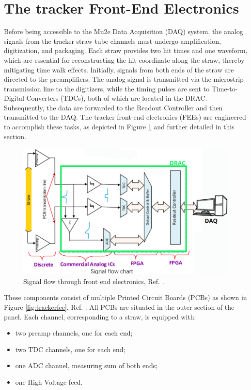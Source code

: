\section{The tracker Front-End Electronics}
Before being accessible to the Mu2e Data Acquisition (DAQ) system, the analog signals 
from the tracker straw tube channels must undergo amplification, digitization, and packaging. 
Each straw provides two hit times and one waveform, which are essential for 
reconstructing the hit coordinate along the straw, thereby mitigating time walk effects.
Initially, signals from both ends of the straw are directed to the preamplifiers. 
The analog signal is transmitted via the microstrip transmission line to the digitizers, 
while the timing pulses are sent to Time-to-Digital Converters (TDCs), both of which 
are located in the DRAC. Subsequently, the data are forwarded to the Readout Controller and then transmitted to the DAQ.
The tracker front-end electronics (FEEs) are engineered to accomplish these tasks, as depicted in Figure \ref{fig:flowfee} and further detailed in this section.
\\
\begin{figure}[!h]
    \centering
    \includegraphics[width =\textwidth]{figures/png/Screenshot_20240529_133230.png}
    \caption{Signal flow through front end electronics, Ref. \cite{bartoszek2015mu2e}.}
    \label{fig:flowfee}
    \end{figure}
These components consist of multiple Printed Circuit Boards (PCBs) as shown in Figure \ref{fig:trackerfee}, Ref. \cite{vadimmu2e}.
All PCBs are situated in the outer section of the panel. Each channel, corresponding to a straw, is equipped with:
\begin{itemize}
    \item two preamp channels, one for each end;
    \item two TDC channels, one for each end;
    \item one ADC channel, measuring sum of both ends;
    \item one High Voltage feed.
\end{itemize}
